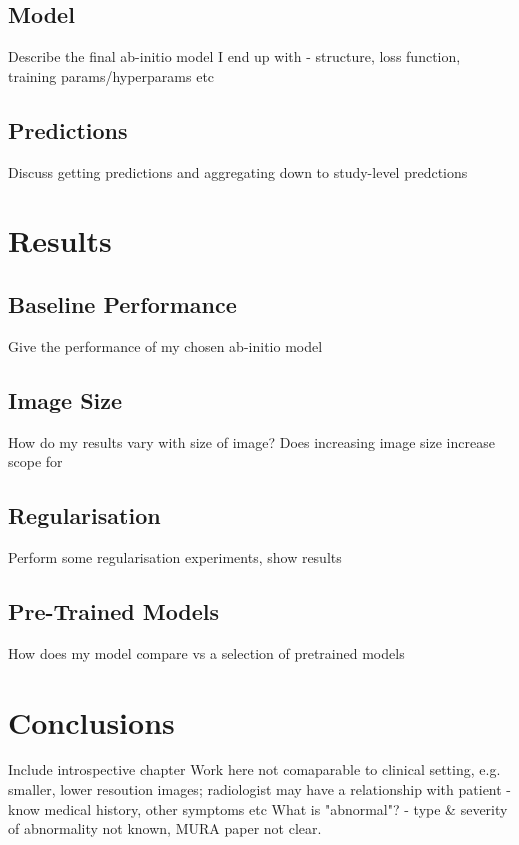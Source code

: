 \documentclass[11pt]{article} %
\theoremstyle{plain}
\theoremstyle{definition}
\begin{document}
\subsection{Model}
Describe the final ab-initio model I end up with - structure, loss function, training params/hyperparams etc

\subsection{Predictions}
Discuss getting predictions and aggregating down to study-level predctions



\newpage
\section{Results}

\subsection{Baseline Performance}
Give the performance of my chosen ab-initio model

\subsection{Image Size}
How do my results vary with size of image? Does increasing image size increase scope for

\subsection{Regularisation}
Perform some regularisation experiments, show results

\subsection{Pre-Trained Models}
How does my model compare vs a selection of pretrained models



\newpage
\section{Conclusions}
Include introspective chapter
Work here not comaparable to clinical setting, e.g. smaller, lower resoution images; radiologist may have a relationship with patient - know medical history, other symptoms etc
What is "abnormal"? - type \& severity of abnormality not known, MURA paper not clear.
\end{document}
